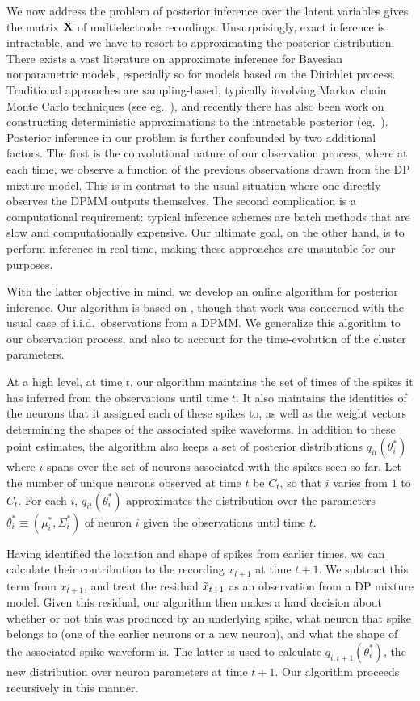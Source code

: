 We now address the problem of posterior inference over the latent variables gives the matrix $\mathbf{X}$ of multielectrode recordings. Unsurprisingly, exact 
inference is intractable, and we have to resort to approximating the posterior distribution.
There exists a vast literature on approximate inference for Bayesian nonparametric models, especially so for models based on the Dirichlet process.
Traditional approaches are sampling-based, typically involving Markov chain Monte Carlo techniques (see eg.\ \citep{Nea2000, IshJam2001}), 
and recently there has also been work on constructing deterministic approximations to the intractable posterior (eg.\ \citep{BleJor2006, MinGha2003}).
Posterior inference in our problem is further confounded by two additional factors. The first is the convolutional nature of our observation process, 
where at each time,
we observe a function of the previous observations drawn from the DP mixture model. This is in contrast to the usual situation where one directly observes 
the DPMM outputs themselves.
The second complication is a computational requirement: typical inference schemes are batch methods that are slow and computationally expensive. 
Our ultimate goal, on the other hand, is to perform inference in real time, making these approaches are unsuitable for our purposes.

With the latter objective in mind, we develop an online algorithm for posterior inference. Our algorithm is based on 
\citep{WangDun2009}, though that work was concerned with the usual case of i.i.d.\ observations from a DPMM. We generalize this algorithm to our 
observation process, and also to account for the time-evolution of the cluster parameters.

At a high level, at time $t$, our algorithm maintains the set of times of the spikes it has inferred from the observations until time $t$. It also maintains
the identities of the neurons that it assigned each of these spikes to, as well as the weight vectors determining the shapes of the associated spike 
waveforms. In addition to these point estimates, the algorithm also keeps a set of posterior distributions $q_{it}(\theta^*_i)$ where $i$ spans over the
set of neurons associated with the spikes seen so far. Let the number of unique neurons observed at time $t$ be $C_t$, so that $i$ varies from $1$ to $C_t$.
For each $i$, $q_{it}(\theta^*_i)$ approximates the distribution over the parameters 
$\theta_i^* \equiv (\mu_i^*, \Sigma_i^*)$ of neuron $i$ given the observations until time $t$. 

Having identified the location and shape of spikes from earlier times, we can calculate their contribution to the recording $x_{t+1}$ at time $t+1$.
We subtract this term from $x_{t+1}$, and treat the residual $\tilde{x}_{t+1}$ as an observation from a DP mixture model.
Given this residual, our algorithm then makes a hard decision about whether or not this was produced by an underlying spike, what neuron that spike belongs 
to (one of the earlier neurons or a new neuron), and what the shape of the associated spike waveform is. The latter is used to calculate
$q_{i,t+1}(\theta^*_i)$, the new distribution over neuron parameters at time $t+1$. Our algorithm proceeds recursively in this manner. 



